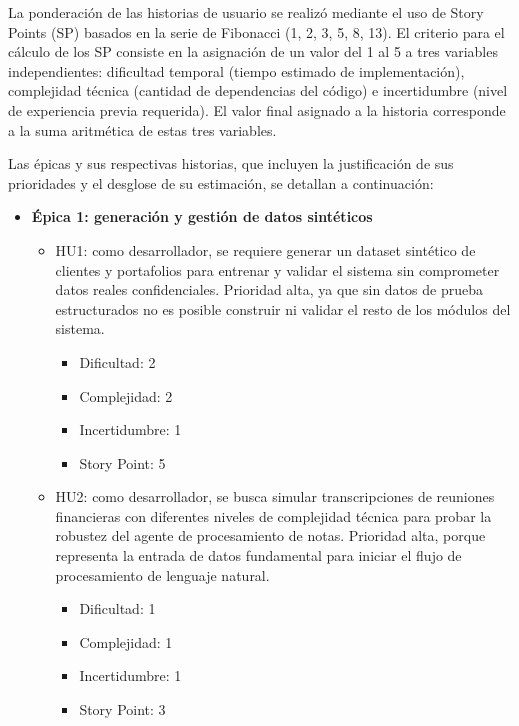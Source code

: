 \documentclass[
11pt, %
]{charter}
\begin{document}
La ponderación de las historias de usuario se realizó mediante el uso de Story Points (SP) basados en la serie de Fibonacci (1, 2, 3, 5, 8, 13). El criterio para el cálculo de los SP consiste en la asignación de un valor del 1 al 5 a tres variables independientes: dificultad temporal (tiempo estimado de implementación), complejidad técnica (cantidad de dependencias del código) e incertidumbre (nivel de experiencia previa requerida). El valor final asignado a la historia corresponde a la suma aritmética de estas tres variables.

Las épicas y sus respectivas historias, que incluyen la justificación de sus prioridades y el desglose de su estimación, se detallan a continuación:

\begin{itemize}
  \item \textbf{\'{E}pica 1: generación y gestión de datos sintéticos}
    \begin{itemize}
      \item HU1: como desarrollador, se requiere generar un dataset sintético de clientes y portafolios para entrenar y validar el sistema sin comprometer datos reales confidenciales. Prioridad alta, ya que sin datos de prueba estructurados no es posible construir ni validar el resto de los módulos del sistema. 
        \begin{itemize}
            \item Dificultad: 2
            \item Complejidad: 2
            \item Incertidumbre: 1
            \item Story Point: 5
        \end{itemize}
      \item HU2: como desarrollador, se busca simular transcripciones de reuniones financieras con diferentes niveles de complejidad técnica para probar la robustez del agente de procesamiento de notas. Prioridad alta, porque representa la entrada de datos fundamental para iniciar el flujo de procesamiento de lenguaje natural.
        \begin{itemize}
            \item Dificultad: 1
            \item Complejidad: 1
            \item Incertidumbre: 1
            \item Story Point: 3
        \end{itemize}
    \end{itemize}


\end{itemize}
\end{document}
